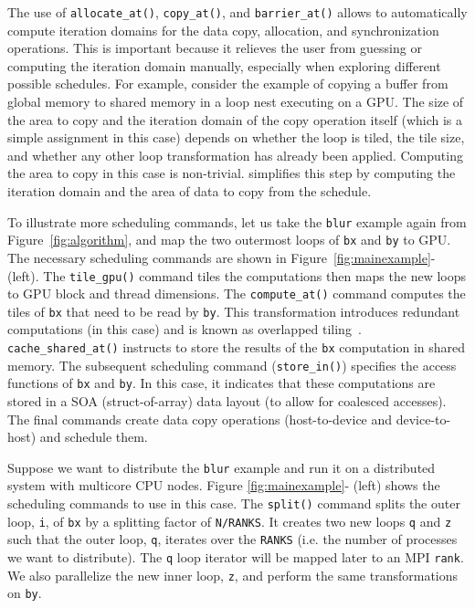 The use of \texttt{allocate\_at()}, \texttt{copy\_at()}, and \texttt{barrier\_at()} allows \framework to automatically compute iteration domains for the data copy, allocation, and synchronization operations.  This is important because it relieves the user from guessing or computing the iteration domain manually, especially when exploring different possible schedules.  For example, consider the example of copying a buffer from global memory to shared memory in a loop nest executing on a GPU.  The size of the area to copy and the iteration domain of the copy operation itself (which is a simple assignment in this case) depends on whether the loop is tiled, the tile size, and  whether any other loop transformation has already been applied. Computing the area to copy in this case is non-trivial.  \framework simplifies this step by computing the iteration domain and the area of data to copy from the schedule.

To illustrate more \framework{} scheduling commands, let us take the \texttt{blur} example again from Figure~\ref{fig:algorithm},
and map the two outermost loops of \texttt{bx} and \texttt{by} to GPU.  The necessary scheduling commands are shown in Figure~\ref{fig:mainexample}-\codetwo{} (left).
The \texttt{tile\_gpu()} command tiles the computations then maps the new loops to GPU block and thread dimensions.  The \texttt{compute\_at()} command computes the tiles of \texttt{bx} that need to be read by \texttt{by}.  This transformation introduces redundant computations (in this case) and is known as overlapped tiling~\cite{Krishnamoorthy:2007:EAP:1273442.1250761}.
\texttt{cache\_shared\_at()} instructs \framework to store the results of the \texttt{bx} computation in shared memory.
The subsequent scheduling command (\texttt{store\_in()}) specifies the access functions of \texttt{bx} and \texttt{by}.  In this case, it indicates that these computations are stored in a SOA (struct-of-array) data layout (to allow for coalesced accesses).  The final commands create data copy operations (host-to-device and device-to-host) and schedule them.

Suppose we want to distribute the \texttt{blur} example and run it on a distributed system with multicore CPU nodes. Figure \ref{fig:mainexample}-\codethree{} (left) shows the scheduling commands to use in this case. The \texttt{split()} command splits the outer loop, \texttt{i}, of \texttt{bx} by a splitting factor of \texttt{N/RANKS}.  It creates two new loops \texttt{q} and \texttt{z} such that the outer loop, \texttt{q}, iterates over the \texttt{RANKS} (i.e. the number of processes we want to distribute).  The \texttt{q} loop iterator will be mapped later to an MPI \texttt{rank}.  We also parallelize the new inner loop, \texttt{z}, and perform the same transformations on \texttt{by}.

